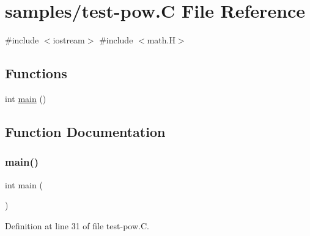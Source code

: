 \hypertarget{test-pow_8_c}{}\section{samples/test-\/pow.C File Reference}
\label{test-pow_8_c}
{\ttfamily \#include $<$iostream$>$}\newline
{\ttfamily \#include $<$math.\+H$>$}\newline
\subsection*{Functions}
\begin{DoxyCompactItemize}
\item 
int \hyperlink{test-pow_8_c_ae66f6b31b5ad750f1fe042a706a4e3d4}{main} ()
\end{DoxyCompactItemize}


\subsection{Function Documentation}
\mbox{\label{test-pow_8_c_ae66f6b31b5ad750f1fe042a706a4e3d4}} 
\subsubsection{\texorpdfstring{main()}{main()}}
{\footnotesize\ttfamily int main (\begin{DoxyParamCaption}{ }\end{DoxyParamCaption})}



Definition at line 31 of file test-\/pow.\+C.

